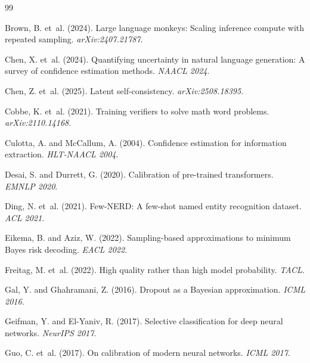 \documentclass[11pt,twocolumn]{article}
\begin{document}
{\small
\begin{thebibliography}{99}

Brown, B. et~al. (2024).
Large language monkeys: Scaling inference compute with repeated sampling.
\textit{arXiv:2407.21787}.

Chen, X. et~al. (2024).
Quantifying uncertainty in natural language generation: A survey of confidence estimation methods.
\textit{NAACL 2024}.

Chen, Z. et~al. (2025).
Latent self-consistency.
\textit{arXiv:2508.18395}.

Cobbe, K. et~al. (2021).
Training verifiers to solve math word problems.
\textit{arXiv:2110.14168}.

Culotta, A. and McCallum, A. (2004).
Confidence estimation for information extraction.
\textit{HLT-NAACL 2004}.

Desai, S. and Durrett, G. (2020).
Calibration of pre-trained transformers.
\textit{EMNLP 2020}.

Ding, N. et~al. (2021).
Few-NERD: A few-shot named entity recognition dataset.
\textit{ACL 2021}.

Eikema, B. and Aziz, W. (2022).
Sampling-based approximations to minimum Bayes risk decoding.
\textit{EACL 2022}.

Freitag, M. et~al. (2022).
High quality rather than high model probability.
\textit{TACL}.

Gal, Y. and Ghahramani, Z. (2016).
Dropout as a {B}ayesian approximation.
\textit{ICML 2016}.

Geifman, Y. and El-Yaniv, R. (2017).
Selective classification for deep neural networks.
\textit{NeurIPS 2017}.

Guo, C. et~al. (2017).
On calibration of modern neural networks.
\textit{ICML 2017}.


\end{thebibliography}}
\end{document}

